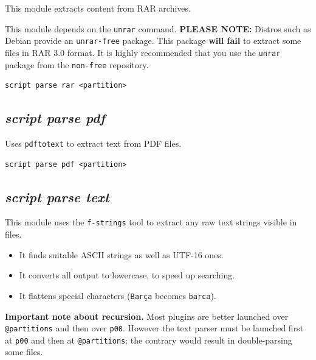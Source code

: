 \documentclass[a4paper,11pt,oneside]{report}
\begin{document}
This module extracts content from RAR archives.

This module depends on the \texttt{unrar} command.
\textbf{PLEASE NOTE:} Distros such as Debian provide an \texttt{unrar-free} package. This package \textbf{will fail} to extract some files in RAR 3.0 format. It is highly recommended that you use the \texttt{unrar} package from the \texttt{non-free} repository.


\begin{verbatim}
script parse rar <partition>
\end{verbatim}



\subsection{\emph{script parse pdf}}

Uses \texttt{pdftotext} to extract text from PDF files.
\begin{verbatim}
script parse pdf <partition>
\end{verbatim}



\subsection{\emph{script parse text}}

This module uses the \texttt{f-strings} tool to extract any raw text strings visible in files.

\begin{itemize}
	\item It finds suitable ASCII strings as well as UTF-16 ones.
	\item It converts all output to lowercase, to speed up searching.
	\item It flattens special characters (\texttt{Barça} becomes \texttt{barca}).
\end{itemize}



\textbf{Important note about recursion.} Most plugins are better launched over \texttt{@partitions} and then over \texttt{p00}. However the text parser must be launched first at \texttt{p00} and then at \texttt{@partitions}; the contrary would result in double-parsing some files.
\end{document}
